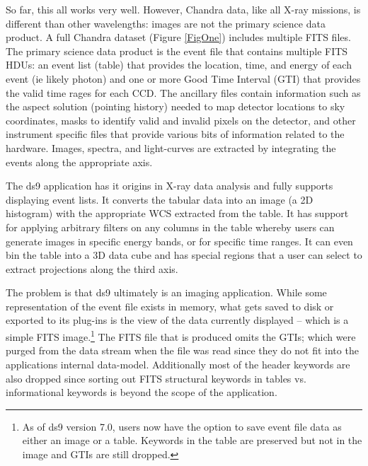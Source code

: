 So far, this all works very well.  However, Chandra data, like all X-ray missions, is different than other wavelengths:  images are not the primary science data product. A full Chandra  dataset (Figure \ref{FigOne}) includes multiple FITS files. The primary science data product is the event file that contains multiple FITS HDUs:  an event list (table) that provides the location, time, and energy of each event (ie likely photon) and one or more Good Time Interval (GTI) that provides the valid time rages for each CCD.  The ancillary files contain information such as the aspect solution (pointing history) needed to map detector locations to sky coordinates, masks to identify valid and invalid pixels on the detector, and other instrument specific files that provide various bits of information related to the hardware.  Images, spectra, and light-curves are extracted by integrating the events along the appropriate axis.

The ds9 application has it origins in X-ray data analysis and fully supports displaying event lists.  It converts the tabular data into an image (a 2D histogram) with the appropriate WCS extracted from the table. It has support for applying arbitrary filters on any columns in the table whereby users can generate images in specific energy bands, or for specific time ranges.  It can even bin the table into a 3D data cube and has special regions that a user can select to extract projections along the third axis.

The problem is that ds9 ultimately is an imaging application. While some  representation of the event file exists in memory, what gets saved to disk or exported to its plug-ins is the view of the data currently displayed -- which is a simple FITS image.\footnote{As of ds9 version 7.0, users now have the option to save event file data as either an image or a table.  Keywords in the table are preserved but not in the image and GTIs are still dropped.}  The FITS file that is produced omits the GTIs; which  were purged from the data stream when the file was read since they do not fit into the applications internal data-model.  Additionally most of the header keywords are also dropped since sorting out FITS structural keywords in tables vs. informational keywords is beyond the scope of the application.

